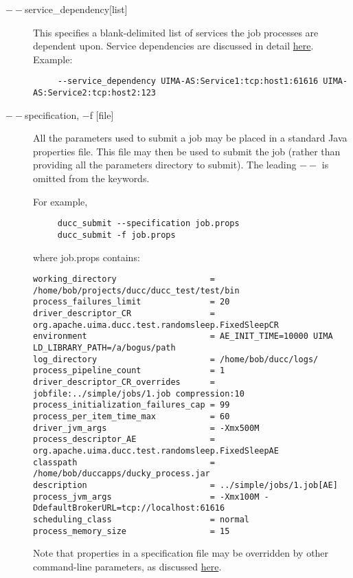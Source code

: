 \begin{description}
           \item[$--$service\_dependency{[list]}] This specifies a blank-delimited list of services the job
             processes are dependent upon. Service dependencies are discussed in detail
             \hyperref[sec:service.endpoints]{here}. Example:
             \begin{verbatim}
     --service_dependency UIMA-AS:Service1:tcp:host1:61616 UIMA-AS:Service2:tcp:host2:123
             \end{verbatim}
           
           \item[$--$specification, $-$f {[file]}  ]
             All the parameters used to submit a job may be placed in a standard Java properties file. 
             This file may then be used to submit the job (rather than providing all the parameters 
             directory to submit). The leading $--$ is omitted from the keywords.

             For example, 
             \begin{verbatim}
     ducc_submit --specification job.props 
     ducc_submit -f job.props 
             \end{verbatim}
             where job.props contains: 
\begin{verbatim}
working_directory                   = /home/bob/projects/ducc/ducc_test/test/bin 
process_failures_limit              = 20 
driver_descriptor_CR                = org.apache.uima.ducc.test.randomsleep.FixedSleepCR 
environment                         = AE_INIT_TIME=10000 UIMA LD_LIBRARY_PATH=/a/bogus/path
log_directory                       = /home/bob/ducc/logs/ 
process_pipeline_count              = 1 
driver_descriptor_CR_overrides      = jobfile:../simple/jobs/1.job compression:10 
process_initialization_failures_cap = 99 
process_per_item_time_max           = 60 
driver_jvm_args                     = -Xmx500M 
process_descriptor_AE               = org.apache.uima.ducc.test.randomsleep.FixedSleepAE 
classpath                           = /home/bob/duccapps/ducky_process.jar 
description                         = ../simple/jobs/1.job[AE] 
process_jvm_args                    = -Xmx100M -DdefaultBrokerURL=tcp://localhost:61616 
scheduling_class                    = normal 
process_memory_size                 = 15 
\end{verbatim}
             Note that properties in a specification file may be overridden by other command-line
             parameters, as discussed \hyperref[chap:cli]{here}.


\end{description}

